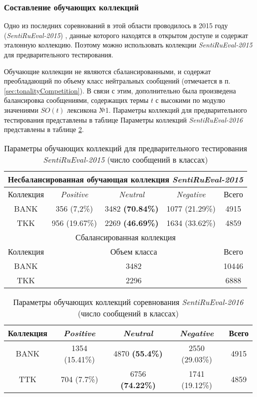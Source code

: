 \subsubsection{Составление обучающих коллекций}

Одно из последних соревнований в этой области проводилось в 2015 году
({\it SentiRuEval-2015}) \cite{dialog2015}, данные которого находятся в открытом
доступе и содержат эталонную коллекцию.
Поэтому можно использовать коллекции {\it SentiRuEval-2015} для предварительного
тестирования.

Обучающие коллекции не являются сбалансированными, и содержат преобладающий
по объему класс нейтральных сообщений (отмечается в п. \ref{sec:tonalityCompetition}).
В связи с этим, дополнительно была произведена балансировка сообщениями,
содержащих термы $t$ с высокими по модулю значениями $SO(t)$ лексикона №1.
Параметры коллекций для предварительного тестирования представлены в таблице
Параметры коллекций {\it SentiRuEval-2016} представлены в таблице \ref{table:train2015balanced}.

\begin{table}[!ht]
\centering
\caption{Параметры обучающих коллекций для предварительного тестирования {\it SentiRuEval-2015} (число сообщений в классах)}
\label{table:train2015}
\begin{tabular}{|c|c|c|c|c|}
\hline
\multicolumn{5}{|c|}{Несбалансированная обучающая коллекция {\it SentiRuEval-2015}}                 \\ \hline
Коллекция & \textit{Positive} & \textit{Neutral} & \textit{Negative} & Всего \\ \hline
BANK      & 356 (7,2\%)       & 3482 {\bf (70.84\%)}   & 1077 (21.29\%)    & 4915  \\ \hline
TKK       & 956 (19.67\%)     & 2269 {\bf (46.69\%)}   & 1634 (33.62\%)    & 4859  \\ \hline
\multicolumn{5}{|c|}{Сбалансированная коллекция}                             \\ \hline
Коллекция & \multicolumn{3}{c|}{Объем класса}                        & Всего \\ \hline
BANK      & \multicolumn{3}{c|}{3482}                                & 10446 \\ \hline
TKK       & \multicolumn{3}{c|}{2296}                                & 6888  \\ \hline
\end{tabular}
\end{table}

\begin{table}[!ht]
\centering
\caption{Параметры обучающих коллекций соревнования {\it SentiRuEval-2016} (число сообщений в классах)}
\label{table:train2015balanced}
\begin{tabular}{|c|c|c|c|c|}
\hline
Коллекция & \textit{Positive} & \textit{Neutral}       & \textit{Negative} & Всего \\ \hline
BANK      & 1354 (15.41\%)    & 4870 {\bf (55.4\%)}    & 2550 (29.03\%)    & 4915  \\ \hline
TTK       & 704 (7.7\%)       & 6756 {\bf (74.22\%)}   & 1741 (19.12\%)    & 4859  \\ \hline
\end{tabular}
\end{table}
